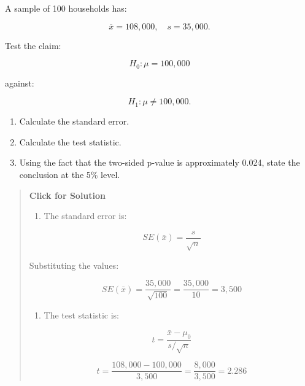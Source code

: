 \documentclass[
  letterpaper,
  DIV=11,
  numbers=noendperiod]{scrreprt}
\providecommand{\tightlist}{%
  \setlength{\itemsep}{0pt}\setlength{\parskip}{0pt}}
\begin{document}
\begin{tcolorbox}[enhanced jigsaw, arc=.35mm, bottomrule=.15mm, bottomtitle=1mm, breakable, colback=white, colbacktitle=quarto-callout-note-color!10!white, colframe=quarto-callout-note-color-frame, coltitle=black, left=2mm, leftrule=.75mm, opacityback=0, opacitybacktitle=0.6, rightrule=.15mm, title=\textcolor{quarto-callout-note-color}{\faInfo}\hspace{0.5em}{Question 8}, titlerule=0mm, toprule=.15mm, toptitle=1mm]

A sample of 100 households has:

\[
\bar{x} = 108{,}000,
\quad
s = 35{,}000.
\]

Test the claim:

\[
H_0: \mu = 100{,}000
\]

against:

\[
H_1: \mu \neq 100{,}000.
\]

\begin{enumerate}
\def\labelenumi{\alph{enumi}.}
\tightlist
\item
  Calculate the standard error.\\
\item
  Calculate the test statistic.\\
\item
  Using the fact that the two-sided p-value is approximately 0.024,
  state the conclusion at the 5\% level.
\end{enumerate}

\begin{quote}
\textbf{Click for Solution}

\begin{enumerate}
\def\labelenumi{\alph{enumi}.}
\tightlist
\item
  The standard error is:
\end{enumerate}

\[
SE(\bar{x}) = \frac{s}{\sqrt{n}}
\]

Substituting the values:

\[
SE(\bar{x})
=
\frac{35{,}000}{\sqrt{100}}
=
\frac{35{,}000}{10}
=
3{,}500
\]

\begin{enumerate}
\def\labelenumi{\alph{enumi}.}
\setcounter{enumi}{1}
\tightlist
\item
  The test statistic is:
\end{enumerate}

\[
t =
\frac{\bar{x} - \mu_0}{s/\sqrt{n}}
\]

\[
t =
\frac{108{,}000 - 100{,}000}{3{,}500}
=
\frac{8{,}000}{3{,}500}
=
2.286
\]


\end{quote}
\end{tcolorbox}
\end{document}
